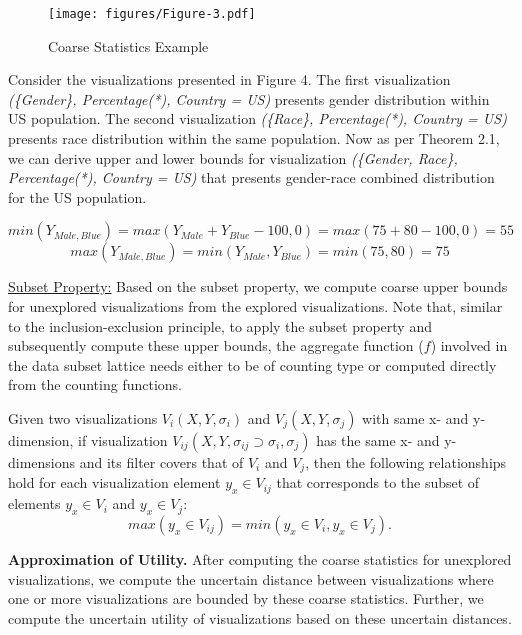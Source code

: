 \begin{figure}[bht]
\label{example}
\centering
\texttt{[image: figures/Figure-3.pdf]}
\caption{Coarse Statistics Example}
\end{figure}

Consider the visualizations presented in Figure 4. The first visualization \textit{(\{Gender\}, Percentage(*), Country = US)} presents gender distribution within US population. The second visualization \textit{(\{Race\}, Percentage(*), Country = US)} presents race distribution within the same population. Now as per Theorem 2.1, we can derive upper and lower bounds for visualization \textit{(\{Gender, Race\}, Percentage(*), Country = US)} that presents gender-race combined distribution for the US population.

$$min(Y_{Male, Blue}) = max(Y_{Male}+Y_{Blue}-100, 0) = max(75+80-100, 0) = 55$$
$$max(Y_{Male, Blue}) = min(Y_{Male}, Y_{Blue}) = min(75, 80) = 75$$

\underline{Subset Property:} Based on the subset property, we compute coarse upper bounds for unexplored visualizations from the explored visualizations. Note that, similar to the inclusion-exclusion principle, to apply the subset property and subsequently compute these upper bounds, the aggregate function ($f$) involved in the data subset lattice needs either to be of counting type or computed directly from the counting functions. 
\begin{theorem}
Given two visualizations $V_i (X, Y, \sigma_i)$ and $V_j (X, Y, \sigma_j)$ with same x- and y-dimension, if visualization $V_{ij} (X, Y, \sigma_{ij} \supset \sigma_i, \sigma_j)$ has the same x- and y- dimensions and its filter covers that of $V_i$ and $V_j$, then the following relationships hold for each visualization element $y_x {\in} V_{ij}$ that corresponds to the subset of elements $y_x {\in} V_{i}$ and $y_x {\in} V_{j}$: $$max(y_x {\in} V_{ij}) = min(y_x {\in} V_{i}, y_x {\in} V_{j}).$$
\end{theorem}

\textbf{Approximation of Utility.} After computing the coarse statistics for unexplored visualizations, we compute the uncertain distance between visualizations where one or more visualizations are bounded by these coarse statistics. Further, we compute the uncertain utility of visualizations based on these uncertain distances. 

